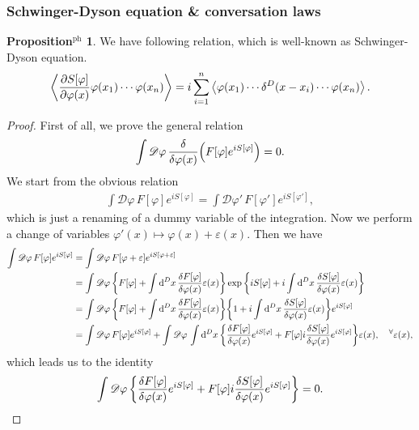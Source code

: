 \documentclass{article}
\theoremstyle{definition}
\newtheorem{propositionph}{Proposition$^\mathrm{ph}$}[section]
\numberwithin{equation}{section}
\renewcommand{\mapsto}{\longmapsto}
\newcommand{\fivarphi}{\int \mathscr{D} \varphi\,}
\newcommand{\intst}{\int \dd^Dx \,}
\begin{document}
\subsubsection{Schwinger-Dyson equation \& conversation laws}
\begin{propositionph}
  We have following relation, which is well-known as Schwinger-Dyson equation.
  \begin{align}
    \ev{\frac{\partial S[\varphi]}{\partial \varphi(x)} \varphi(x_1) \cdots \varphi(x_n)} = i \sum_{i = 1}^{n} \ev{\varphi(x_1) \cdots \delta^D(x - x_i) \cdots \varphi(x_n)}.
  \end{align}  
\end{propositionph}
\begin{proof}
  First of all, we prove the general relation
  \begin{align}
    \int \mathscr{D} \varphi \, \frac{\delta}{\delta \varphi(x)} \qty(F[\varphi] e^{iS[\varphi]}) = 0.
  \end{align}
  We start from the obvious relation
  \begin{align}
    \int \mathscr{D} \varphi \, F[\varphi] e^{iS[\varphi]} = \int \mathscr{D} \varphi' \, F[\varphi'] e^{iS[\varphi']},
  \end{align}
  which is just a renaming of a dummy variable of the integration. Now we perform a change of variables $\varphi'(x) \mapsto \varphi(x) + \varepsilon(x)$. Then we have
  \begin{align}
    \int \mathscr{D}\varphi \, F[\varphi] e^{iS[\varphi]}
    &= \fivarphi F[\varphi + \varepsilon]e^{iS[\varphi + \varepsilon]} \notag \\
    &= \fivarphi \qty{F[\varphi] + \intst \frac{\delta F[\varphi]}{\delta \varphi(x)} \varepsilon(x)}
      \exp\qty{iS[\varphi] + i \intst \frac{\delta S[\varphi]}{\delta \varphi(x)} \varepsilon(x)} \notag \\
    &= \fivarphi \qty{F[\varphi] + \intst \frac{\delta F[\varphi]}{\delta \varphi(x)} \varepsilon(x)}
      \qty{1 + i\intst \frac{\delta S[\varphi]}{\delta \varphi(x)}\varepsilon(x)}e^{iS[\varphi]} \notag \\
    &= \fivarphi F[\varphi] e^{iS[\varphi]} + \fivarphi \intst
      \qty{\frac{\delta F[\varphi]}{\delta\varphi(x)} e^{iS[\varphi]} + F[\varphi] i\frac{\delta S[\varphi]}{\delta \varphi(x)} e^{iS[\varphi]}}\varepsilon(x),
      \quad ^\forall \varepsilon(x),
  \end{align}
  which leads us to the identity
  \begin{align}
    \fivarphi \qty{\frac{\delta F[\varphi]}{\delta\varphi(x)} e^{iS[\varphi]} + F[\varphi] i\frac{\delta S[\varphi]}{\delta \varphi(x)} e^{iS[\varphi]}} = 0.

\end{align}
\end{proof}
\end{document}
